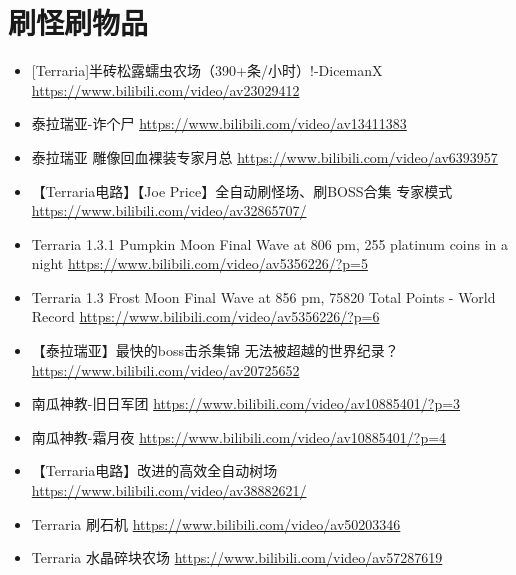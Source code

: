 \section{刷怪刷物品}
\begin{itemize}
\item {[}Terraria]半砖松露蠕虫农场（390+条/小时）!-DicemanX \url{https://www.bilibili.com/video/av23029412}
\item 泰拉瑞亚-诈个尸 \url{https://www.bilibili.com/video/av13411383}
\item 泰拉瑞亚 雕像回血裸装专家月总 \url{https://www.bilibili.com/video/av6393957}
\item 【Terraria电路】【Joe Price】全自动刷怪场、刷BOSS合集 专家模式 \url{https://www.bilibili.com/video/av32865707/}
\item Terraria 1.3.1 Pumpkin Moon Final Wave at 806 pm, 255 platinum coins in a night \url{https://www.bilibili.com/video/av5356226/?p=5}
\item Terraria 1.3 Frost Moon Final Wave at 856 pm, 75820 Total Points - World Record \url{https://www.bilibili.com/video/av5356226/?p=6}
\item 【泰拉瑞亚】最快的boss击杀集锦 无法被超越的世界纪录？ \url{https://www.bilibili.com/video/av20725652}
\item 南瓜神教-旧日军团 \url{https://www.bilibili.com/video/av10885401/?p=3}
\item 南瓜神教-霜月夜 \url{https://www.bilibili.com/video/av10885401/?p=4}
\item 【Terraria电路】改进的高效全自动树场 \url{https://www.bilibili.com/video/av38882621/}
\item Terraria 刷石机 \url{https://www.bilibili.com/video/av50203346}
\item Terraria 水晶碎块农场 \url{https://www.bilibili.com/video/av57287619}
\end{itemize}

